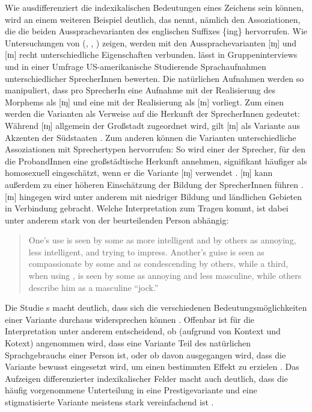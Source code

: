 Wie ausdifferenziert die indexikalischen Bedeutungen eines Zeichens sein können, wird an einem weiteren Beispiel deutlich, das \citet[465--466]{Eckert2008} nennt, nämlich den Assoziationen, die die beiden Aussprachevarianten des englischen Suffixes \{ing\}  hervorrufen. 
Wie Untersuchungen von \citeauthor{CampbellKibler.2007} (\citeyear{CampbellKibler.2005}, \citeyear{CampbellKibler.2007}, \citeyear{CampbellKibler.2008}) zeigen, werden mit den Aussprachevarianten [ɪŋ] und [ɪn] recht unterschiedliche Eigenschaften verbunden. 
\citet{CampbellKibler.2007} lässt in Gruppeninterviews und in einer Umfrage US-amerikanische  Studierende Sprachaufnahmen unterschiedlicher SprecherInnen bewerten. 
Die natürlichen Aufnahmen werden so manipuliert, dass pro SprecherIn eine Aufnahme mit der Realisierung des Morphems als [ɪŋ] und eine mit der Realisierung als [ɪn] vorliegt. 
Zum einen werden die Varianten als Verweise auf die Herkunft der SprecherInnen gedeutet: Während [ɪŋ] allgemein der Großstadt zugeordnet wird, gilt [ɪn] als Variante aus Akzenten der Südstaaten \citep[s.][]{CampbellKibler.2007}. 
Zum anderen können die Varianten unterschiedliche Assoziationen mit Sprechertypen hervorrufen: So wird einer der Sprecher, für den die ProbandInnen eine großstädtische Herkunft annehmen, signifikant häufiger als homosexuell eingeschätzt, wenn er die Variante [ɪŋ] verwendet \citep[s.][50]{CampbellKibler.2007}. 
[ɪŋ] kann außerdem zu einer höheren Einschätzung der Bildung der SprecherInnen führen \citep[s.][46--47]{CampbellKibler.2007}. 
[ɪn] hingegen wird unter anderem mit niedriger Bildung und ländlichen Gebieten in Verbindung gebracht. 
Welche Interpretation zum Tragen kommt, ist dabei unter anderem stark von der beurteilenden Person abhängig: 
\begin{quote} One’s  use is seen by some as more intelligent and by others as annoying, less intelligent, and trying to impress. Another’s  guise is seen as compassionate by some and as condescending by others, while a third, when using , is seen by some as annoying and less masculine, while others describe him as a masculine “jock.” \citep[637]{CampbellKibler.2008} \end{quote}
Die Studie \citeauthor{CampbellKibler.2008}s macht deutlich, dass sich die verschiedenen Bedeutungsmöglichkeiten einer Variante durchaus widersprechen können \citep[vgl. auch][93--94]{Jaffe.2016}. 
Offenbar ist für die Interpretation unter anderem entscheidend, ob (aufgrund von Kontext und Kotext) angenommen wird, dass eine Variante Teil des \glqq natürlichen\grqq{} Sprachgebrauchs einer Person ist, oder ob davon ausgegangen wird, dass die Variante bewusst eingesetzt wird, um einen bestimmten Effekt zu erzielen \citep[s.][640]{CampbellKibler.2008}. 
Das Aufzeigen differenzierter indexikalischer Felder macht auch deutlich, dass die häufig vorgenommene Unterteilung in eine {Pres\-tige\-variante} und eine stigmatisierte Variante meistens stark vereinfachend ist \citep[s.][226]{Eckert2004}. 

